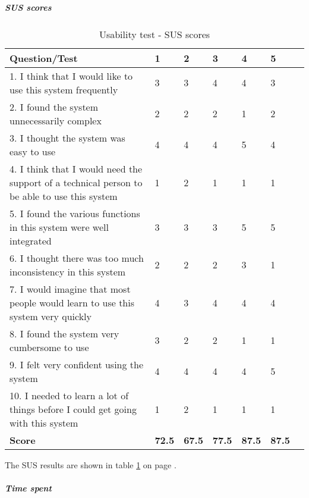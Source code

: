 			\subparagraph{SUS scores}
			 	\begin{table}
			\begin{tabular}{p{8cm}|l|l|l|l|l|l}	\hline
				\textbf{Question/Test}&\textbf{1}&\textbf{2}&\textbf{3}&\textbf{4}&\textbf{5}\\ \hline \hline
				1. I think that I would like to use this system frequently&3&3&4&4&3\\ \hline
				2. I found the system unnecessarily complex&2&2&2&1&2\\ \hline
				3. I thought the system was easy to use&4&4&4&5&4\\ \hline
				4. I think that I would need the support of a technical person to be able to use this system&1&2&1&1&1\\ \hline
				5. I found the various functions in this system were well integrated&3&3&3&5&5\\ \hline
				6. I thought there was too much inconsistency in this system&2&2&2&3&1\\ \hline
				7. I would imagine that most people would learn to use this system very quickly&4&3&4&4&4\\ \hline
				8. I found the system very cumbersome to use&3&2&2&1&1\\ \hline
				9. I felt very confident using the system&4&4&4&4&5\\ \hline
				10. I needed to learn a lot of things before I could get going with this system&1&2&1&1&1\\ \hline \hline
				\textbf{Score}&\textbf{72.5}&\textbf{67.5}&\textbf{77.5}&\textbf{87.5}&\textbf{87.5}\\ \hline 
				
			\end{tabular}
			\caption{Usability test - SUS scores} \label{tab:usabilitysusscore}
		\end{table}
			The SUS results are shown in table \ref{tab:usabilitysusscore} on page \pageref{tab:usabilitysusscore}.
			\newline\newline
			\subparagraph{Time spent}
